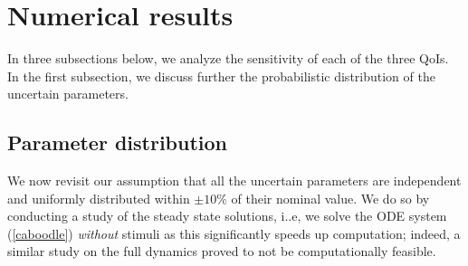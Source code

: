 \section{Numerical results}
\label{sec:results}
In three subsections below, we analyze  the sensitivity of each of the three QoIs. In the first subsection, we discuss  further the probabilistic distribution of the uncertain parameters.  

\subsection{Parameter distribution}
\label{sec:param_sampling}

We now revisit our assumption that all the uncertain parameters are independent and uniformly distributed within $\pm 10\%$ of  their nominal value. We do so by conducting a study of the steady state solutions, i..e, we solve the ODE system (\ref{caboodle}) {\sl without} stimuli as this significantly speeds up computation; indeed, a similar study on the full dynamics proved to not be computationally feasible.  

